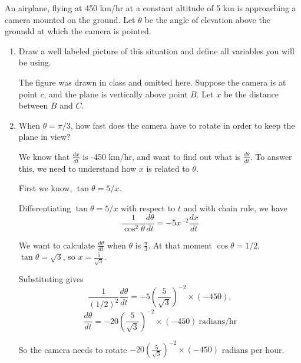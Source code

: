 \documentclass[12pt,twoside]{article}
\begin{document}
An airplane, flying at 450 km/hr at a constant altitude of 5 km is approaching a camera mounted on the ground. Let $\theta$ be the angle of elevation above the groundd at which the camera is pointed. 

\begin{enumerate}
\item Draw a well labeled picture of this situation and define all variables you will be using. 

The figure was drawn in class and omitted here. Suppose the camera is at point $c$, and the plane is vertically above point $B$. Let $x$ be the distance between $B$ and $C$. 
\item When $\theta = \pi /3 $, how fast does the camera have to rotate in order to keep the plane in view? 

We know that $\frac{dx}{dt}$ is -450 km/hr, and want to find out what is $\frac{d\theta}{dt}$. To answer this, we need to understand how $x$ is related to $\theta$. 

First we know, $\tan \theta = 5/x$. 

Differentiating $\tan \theta = 5/x$ with respect to $t$ and with chain rule, we have 
$$ \frac{1}{\cos^2 \theta} \frac{d\theta}{dt} = -5x^{-2} \frac{dx}{dt} $$

We want to calculate $\frac{d\theta}{dt}$ when $\theta$ is $\frac{\pi}{3}$. At that moment $\cos \theta = 1/2$, $\tan \theta = \sqrt{3}$, so $ x= \frac{5}{\sqrt{3}}$. 

Substituting gives
$$ \frac{1}{(1/2)^2} \frac{d\theta}{dt} = -5 (\frac{5}{\sqrt{3}})^{-2} \times (-450) ,$$
$$\frac{d\theta}{dt} = -20(\frac{5}{\sqrt{3}})^{-2} \times (-450)  ~\mbox{radians/hr} $$

So the camera needs to rotate $-20(\frac{5}{\sqrt{3}})^{-2} \times (-450)$ radians per hour. 
\end{enumerate}
\end{document}
